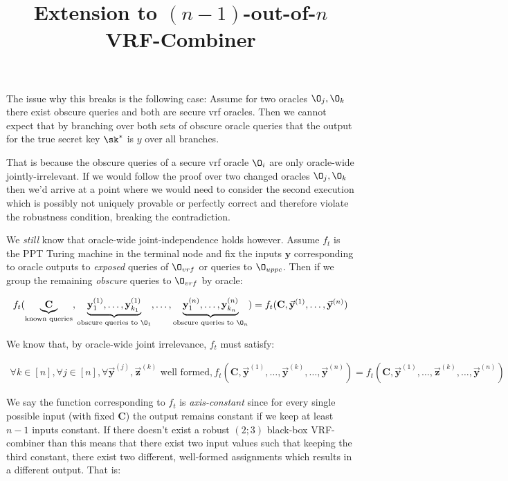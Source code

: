 \documentclass[11pt]{article}
\title{Extension to $(n-1)$-out-of-$n$ VRF-Combiner}
\begin{document}
The issue why this breaks is the following case:
Assume for two oracles $\O_j, \O_k$ there exist obscure queries 
and both are secure vrf oracles. Then we cannot expect that by 
branching over both sets of obscure oracle queries that the output 
for the true secret key $\sk^*$ is $y$ over all branches.

That is because the obscure queries of a secure vrf oracle $\O_i$
are only oracle-wide jointly-irrelevant. If we would follow the proof 
over two changed oracles $\O_j, \O_k$ then we'd arrive at a point 
where we would need to consider the second execution which is possibly 
not uniquely provable or perfectly correct and therefore violate 
the robustness condition, breaking the contradiction.

We \emph{still} know that oracle-wide joint-independence holds however.
Assume $f_t$ is the PPT Turing machine in the terminal node and fix the 
inputs $\mathbf y$ corresponding to oracle outputs to \emph{exposed}
queries of $\O_{vrf}$ or queries to $\O_{uppc}$. Then if we 
group the remaining \emph{obscure} queries to $\O_{vrf}$ by oracle:

\begin{align*}
	f_t(\underbrace{\mathbf C}_{\text{known queries}}, \underbrace{\mathbf y_1^{(1)}, \ldots, \mathbf y_{k_1}^{(1)}}_{\text{obscure queries to }\O_1}, \ldots, \underbrace{\mathbf y_1^{(n)}, \ldots, \mathbf y_{k_n}^{(n)}}_{\text{obscure queries to }\O_n}) = f_t(\mathbf C, \vec{\mathbf y}^{(1)}, \ldots, \vec{\mathbf y}^{(n)})
\end{align*}

We know that, by oracle-wide joint irrelevance, $f_t$ must satisfy:

\begin{align*}
	\forall k \in [n], \forall j \in [n], \forall \vec{\mathbf y}^{(j)}, \vec{\mathbf z}^{(k)} \text{ well formed}, f_t(\mathbf C, \vec{\mathbf y}^{(1)}, \ldots, \vec{\mathbf y}^{(k)}, \ldots, \vec{\mathbf y}^{(n)})
	= f_t(\mathbf C, \vec{\mathbf y}^{(1)}, \ldots, \vec{\mathbf z}^{(k)}, \ldots, \vec{\mathbf y}^{(n)})
\end{align*}

We say the function corresponding to $f_t$ is \emph{axis-constant} since for every single possible input (with fixed $\mathbf C$) the output remains constant if we keep at least $n-1$ inputs constant. If there doesn't exist a robust $(2;3)$ black-box VRF-combiner than this means that there exist two input values such that keeping the third constant, there exist two different, well-formed assignments which results in a different output. That is:
\end{document}
